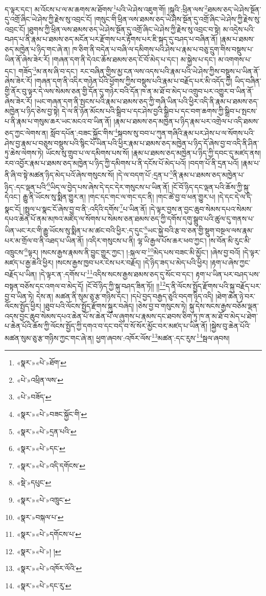 ད་ལྟར་དང་། མ་འོངས་པ་ལ་མ་ཆགས་མ་ཐོགས་\footnote{«སྣར་»«པེ་»ཐོག་}པའི་ཡེ་ཤེས་འཇུག་གོ། །སྐུའི་:ཕྲིན་ལས་\footnote{«པེ་»འཕྲིན་ལས་}ཐམས་ཅད་ཡེ་ཤེས་སྔོན་དུ་འགྲོ་ཞིང་ཡེ་ཤེས་ཀྱི་རྗེས་སུ་འབྲང་ངོ། །གསུང་གི་ཕྲིན་ལས་ཐམས་ཅད་ཡེ་ཤེས་སྔོན་དུ་འགྲོ་ཞིང་ཡེ་ཤེས་ཀྱི་རྗེས་སུ་འབྲང་ངོ། །ཐུགས་ཀྱི་ཕྲིན་ལས་ཐམས་ཅད་ཡེ་ཤེས་སྔོན་དུ་འགྲོ་ཞིང་ཡེ་ཤེས་ཀྱི་རྗེས་སུ་འབྲང་བ་སྟེ། མ་འདྲེས་པའི་བཤད་པ་ནི་རྣམ་པ་ཐམས་ཅད་མངོན་པར་རྫོགས་པར་རྟོགས་པར་ཇི་སྐད་དུ་བཤད་པ་བཞིན་ནོ། །རྣམ་པ་ཐམས་ཅད་མཁྱེན་པ་ཉིད་གང་ཞེ་ན། ཁ་ཅིག་ནི་བདེན་པ་བཞི་ལ་དམིགས་པའི་ཤེས་པ་རྣམ་པ་བཅུ་དྲུག་གིས་བསྡུས་པ་ཡིན་ནོ་ཞེས་ཟེར་རོ། །གཞན་དག་ནི་དེའང་ཆོས་ཐམས་ཅད་ངོ་བོ་མེད་པ་དང་། མ་སྐྱེས་པ་དང་། མ་འགགས་པ་དང་། གཟོད་\footnote{«པེ་»བཟོད་}མ་ནས་ཞི་བ་དང་། རང་བཞིན་གྱིས་མྱ་ངན་ལས་འདས་པའི་རྣམ་པའི་ཡེ་ཤེས་ཀྱིས་བསྡུས་པ་ཡིན་ནོ་ཞེས་ཟེར་རོ། །གཞན་དག་ནི་འདིར་གཉེན་པོའི་ཕྱོགས་ཀྱིས་བསྡུས་པའི་རྣམ་པ་བརྗོད་པར་མི་འདོད་ཀྱི། ཡིད་བཞིན་གྱི་ནོར་བུ་ལྟར་དེ་ལས་སེམས་ཅན་གྱི་དོན་དུ་གཉེར་བའི་དོན་ཁ་ན་མ་ཐོ་བ་མེད་པ་འགྲུབ་པར་འགྱུར་བ་ཡིན་ནོ་ཞེས་ཟེར་རོ། །ཡང་གཞན་དག་ནི་སྤངས་པའི་རྣམ་པ་ཐམས་ཅད་ཀྱི་གཞི་ཡིན་པའི་ཕྱིར་འདི་ནི་རྣམ་པ་ཐམས་ཅད་མཁྱེན་པ་ཉིད་ཅེས་བྱ་སྟེ། དེ་ལ་ནི་ཉོན་མོངས་པའི་སྒྲིབ་པ་དང་ཤེས་བྱའི་སྒྲིབ་པ་དང་བག་ཆགས་ཀྱི་སྒྲིབ་པ་སྤངས་པ་ནི་རྣམ་པ་གསུམ་ཆར་ཡང་མངའ་བ་ཡིན་ནོ། །རྣམ་པ་ཐམས་ཅད་མཁྱེན་པ་ཉིད་རྣམ་པར་འགྲེལ་པ་འདི་ཐམས་ཅད་ཀྱང་ལེགས་ན། སློབ་དཔོན་:བཟང་སྐྱོང་གིས་\footnote{«སྣར་»«པེ་»བཟང་སྐྱོང་གི་}སྐབས་སུ་བབ་པ་ཀུན་གཞིའི་རྣམ་པར་ཤེས་པ་ལ་སོགས་པའི་ཤེས་བྱ་རྣམ་པ་བཅུས་བསྡུས་པའི་སྙིང་པོ་ཡིན་པའི་ཕྱིར་རྣམ་པ་ཐམས་ཅད་མཁྱེན་པ་ཉིད་དོ་ཞེས་བྱ་བ་འདི་ནི་ཤིན་ཏུ་ཆེས་ལེགས་ཏེ། ཡོངས་སུ་གྲུབ་པ་ལ་དམིགས་པས་སོ། །རྣམ་པ་ཐམས་ཅད་མཁྱེན་པ་ཉིད་ཀྱི་དབང་དུ་མཛད་ནས། རབ་འབྱོར་རྣམ་པ་ཐམས་ཅད་མཁྱེན་པ་ཉིད་ཀྱི་དམིགས་པ་ནི་དངོས་པོ་མེད་པའོ། །བདག་པོ་ནི་དྲན་པའོ། །རྣམ་པ་ནི་ཞི་བ་སྟེ་མཚན་ཉིད་མེད་པའོ་ཞེས་གསུངས་སོ། །དེ་ལ་བདག་པོ་:དྲན་པ་\footnote{«སྣར་»«པེ་»དྲན་པའི་}ནི་རྣམ་པ་ཐམས་ཅད་མཁྱེན་པ་ཉིད་:དང་ལྡན་པའི་\footnote{«སྣར་»«པེ་»དང་}ཡིད་ལ་བྱེད་པས་ཞེས་དེ་དང་དེར་གསུངས་པ་ཡིན་ནོ། །ངོ་བོ་ཉིད་དང་ལྡན་པའི་ཆོས་ཀྱི་སྐུ་དེའང་། རྒྱུ་ནི་ཡོངས་སུ་སྨིན་གྱུར་ན། །གང་དང་གང་ལ་གང་དང་ནི། །གང་ཚེ་བྱ་བ་ཕན་གྱུར་པ། །དེ་དང་དེ་ལ་དེ་སྣང་ངོ། །སྤྲུལ་པ་སྣང་ངོ་ཞེས་བྱ་བ་ནི་:འདིའི་དགོས་\footnote{«སྣར་»«པེ་»འདི་དགོངས་}པ་ཡིན་ནོ། །དེ་ལྟར་བྱས་ན་བྱང་ཆུབ་སེམས་དཔའ་སེམས་དཔའ་ཆེན་པོ་ནམ་མཁའ་མཛོད་ལ་སོགས་པ་སེམས་ཅན་ཐམས་ཅད་ཀྱི་དགོས་དགུ་སྒྲུབ་པའི་ཚུལ་དུ་གནས་པ་ཡིན་ཡང་རང་གི་རྒྱུ་ཡོངས་སུ་སྨིན་པ་མ་ཚང་བའི་ཕྱིར་:ད་དུང་\footnote{«སྡེ་»དཔུང་}ཡང་སྐྱེ་བའི་རྩ་བ་ཅན་གྱི་སྡུག་བསྔལ་ལས་རྣམ་པར་མ་གྲོལ་བ་ནི་འཐད་པ་ཡིན་ནོ། །འདིར་གསུངས་པ་ནི། ལྷ་ཡི་རྒྱལ་པོས་ཆར་ཕབ་ཀྱང་། །ས་བོན་མི་རུང་མི་འཁྲུངས་\footnote{«སྣར་»«པེ་»འཁྲུང་}ལྟར། །སངས་རྒྱས་རྣམས་ནི་བྱུང་གྱུར་ཀྱང་། །:སྐལ་བ་\footnote{«སྣར་»བསྐལ་པ་}མེད་པས་བཟང་མི་མྱོང་། །ཞེས་བྱ་བའོ། །དེ་ལྟར་མཛད་པ་རྒྱ་ཆེའི་ཕྱིར། །སངས་རྒྱས་ཁྱབ་པར་ངེས་པར་བརྗོད། །དེ་ཉིད་ཟད་པ་མེད་པའི་ཕྱིར། །རྟག་པ་ཞེས་ཀྱང་བརྗོད་པ་ཡིན། །དེ་ལྟར་ན་:དགོས་པ་\footnote{«སྣར་»«པེ་»དགོངས་པ་}འདིས་སངས་རྒྱས་ཐམས་ཅད་དུ་སོང་བ་དང་། རྟག་པ་ཡིན་པར་བཤད་པས་བསྟན་བཅོས་དང་འགལ་བ་མེད་དོ། །ངོ་བོ་ཉིད་ཀྱི་སྐུ་བཤད་ཟིན་ཏོ།། །།\footnote{«སྣར་»«པེ་»། །}ད་ནི་ལོངས་སྤྱོད་རྫོགས་པའི་སྐུ་བརྗོད་པར་བྱ་བ་ཡིན་ཏེ། དེས་ན། མཚན་ནི་སུམ་ཅུ་རྩ་གཉིས་དང་། །དཔེ་བྱད་བརྒྱད་ཅུའི་བདག་ཉིད་འདི། །ཐེག་ཆེན་ཉེ་བར་ལོངས་སྤྱོད་ཕྱིར། །ཐུབ་པའི་ལོངས་སྤྱོད་རྫོགས་སྐུར་བཞེད། །ཅེས་བྱ་བ་གསུངས་ཏེ། སྐུ་དེས་སངས་རྒྱས་བཅོམ་ལྡན་འདས་བྱང་ཆུབ་སེམས་དཔའ་ཆེན་པོ་ས་ཆེན་པོ་ལ་ཞུགས་པ་རྣམས་དང་ཐབས་ཅིག་ཏུ་ཁ་ན་མ་ཐོ་བ་མེད་པ་ཐེག་པ་ཆེན་པོའི་ཆོས་ཀྱི་ལོངས་སྤྱོད་ཀྱི་དགའ་བ་དང་བདེ་བ་སོ་སོར་མྱོང་བར་མཛད་པ་ཡིན་ནོ། །སྐྱེས་བུ་ཆེན་པོའི་མཚན་སུམ་ཅུ་རྩ་གཉིས་ཀྱང་གང་ཞེ་ན། ཕྱག་ཞབས་:འཁོར་ལོས་\footnote{«སྣར་»«པེ་»འཁོར་ལོའི་}མཚན་:དང་རུས་\footnote{«སྣར་»«པེ་»དང་རུ་}སྦལ་ཞབས། 